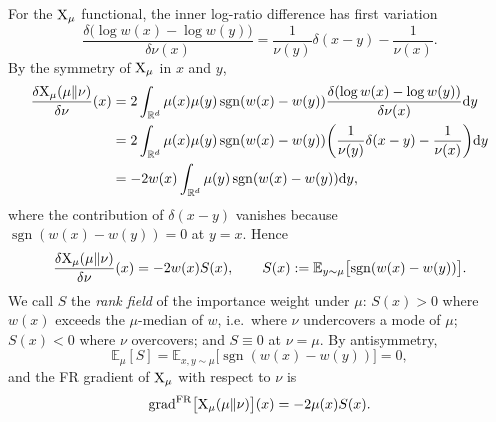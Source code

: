 \documentclass{article}
\begin{document}
For the $\mathrm{X}_\mu$ functional, the inner log-ratio difference has first variation
\begin{equation*}
    \frac{\delta\bigl(\log w(x) - \log w(y)\bigr)}{\delta\nu(x)} = \frac{1}{\nu(y)}\delta(x-y) - \frac{1}{\nu(x)}.
\end{equation*}
By the symmetry of $\mathrm{X}_\mu$ in $x$ and $y$,
\begin{align*}
    \frac{\delta \mathrm{X}_\mu(\mu\|\nu)}{\delta \nu}(x) & =
    2 \int_{\mathbb R^d} \mu(x) \mu(y) \operatorname{sgn}(w(x) - w(y)) \frac{\delta (\log w(x) - \log w(y))}{\delta\nu(x)} \mathrm{d} y \\
    & = 2 \int_{\mathbb R^d} \mu(x) \mu(y) \operatorname{sgn}(w(x) - w(y))
    \bigg(\frac1{\nu(y)}\delta(x-y) - \frac1{\nu(x)}\bigg) \mathrm{d} y \\
    & = -2 w(x) \int_{\mathbb R^d} \mu(y) \operatorname{sgn}(w(x) - w(y))  \mathrm{d} y,
\end{align*}
where the contribution of $\delta(x-y)$ vanishes because $\operatorname{sgn}(w(x) - w(y)) = 0$ at $y = x$. Hence
\begin{equation}
    \frac{\delta \mathrm{X}_\mu(\mu\|\nu)}{\delta \nu}(x) = - 2w(x)S(x),
    \qquad
    S(x) := \mathbb E_{y\sim\mu}\bigl[\operatorname{sgn}(w(x) - w(y))\bigr].
    \label{eq: var-X}
\end{equation}
We call $S$ the \emph{rank field} of the importance weight under $\mu$: $S(x) > 0$ where $w(x)$ exceeds the $\mu$-median of $w$, i.e.\ where $\nu$ undercovers a mode of $\mu$; $S(x) < 0$ where $\nu$ overcovers; and $S \equiv 0$ at $\nu = \mu$. By antisymmetry,
\begin{equation*}
    \mathbb E_\mu[S] = \mathbb E_{x,y\sim \mu}\bigl[\operatorname{sgn}(w(x) - w(y))\bigr] = 0,
\end{equation*}
and the FR gradient of $\mathrm{X}_\mu$ with respect to $\nu$ is
\begin{equation}
    \mathrm{grad}^{\mathrm{FR}}\big[\mathrm{X}_\mu(\mu\|\nu)\big](x) = -2\mu(x) S(x).
    \label{eq: FR-grad-X}
\end{equation}
\end{document}

